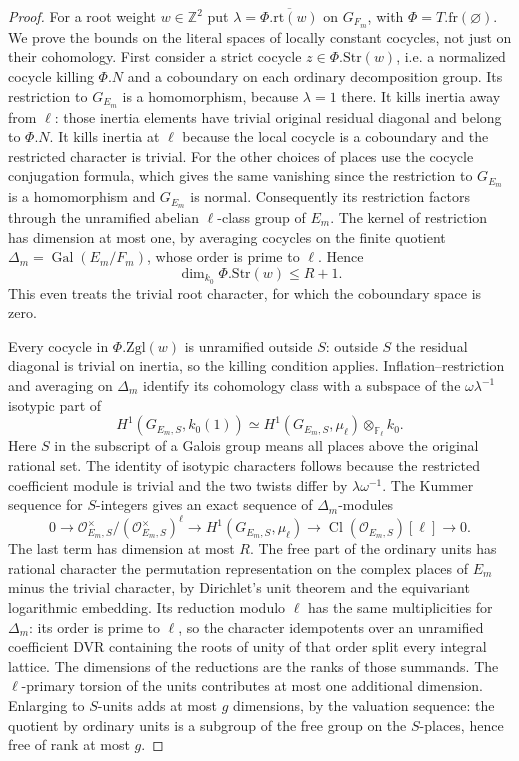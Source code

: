 \begin{proof}
For a root weight $w\in\mathbb Z^2$ put
$\lambda=\overline{\Phi.\mathrm{rt}(w)}$ on $G_{F_m}$, with
$\Phi=T.\mathrm{fr}(\varnothing)$. We prove the bounds on the
literal spaces of locally constant cocycles, not just on
their cohomology. First consider a strict cocycle
$z\in\Phi.\mathrm{Str}(w)$, i.e. a normalized cocycle
killing $\Phi.N$ and a coboundary on each ordinary
decomposition group. Its restriction to $G_{E_m}$ is a
homomorphism, because $\lambda=1$ there. It kills inertia
away from $\ell$: those inertia elements have trivial
original residual diagonal and belong to $\Phi.N$.
It kills inertia at $\ell$ because the local cocycle is a
coboundary and the restricted character is trivial.
For the other choices of places use the cocycle conjugation
formula, which gives the same vanishing since the restriction
to $G_{E_m}$ is a homomorphism and $G_{E_m}$ is normal.
Consequently its restriction factors through the unramified
abelian $\ell$-class group of $E_m$. The kernel of restriction
has dimension at most one, by averaging cocycles on the
finite quotient $\Delta_m=\operatorname{Gal}(E_m/F_m)$,
whose order is prime to $\ell$. Hence
\[
                  \dim_{k_0}\Phi.\mathrm{Str}(w)\leq R+1 .
\]
This even treats the trivial root character, for which the
coboundary space is zero.

Every cocycle in $\Phi.\mathrm{Zgl}(w)$ is unramified
outside $S$: outside $S$ the residual diagonal is trivial
on inertia, so the killing condition applies. Inflation--restriction
and averaging on $\Delta_m$ identify its cohomology class
with a subspace of the $\omega\lambda^{-1}$ isotypic part of
\[
 H^1(G_{E_m,S},k_0(1))
  \simeq H^1(G_{E_m,S},\mu_\ell)\otimes_{\mathbb F_\ell}k_0.
\]
Here $S$ in the subscript of a Galois group means all places
above the original rational set. The identity of isotypic
characters follows because the restricted coefficient module
is trivial and the two twists differ by
$\lambda\omega^{-1}$. The Kummer sequence for $S$-integers gives
an exact sequence of $\Delta_m$-modules
\[
 0\longrightarrow
 \mathcal O_{E_m,S}^{\times}/(\mathcal O_{E_m,S}^{\times})^\ell
 \longrightarrow H^1(G_{E_m,S},\mu_\ell)
 \longrightarrow \operatorname{Cl}(\mathcal O_{E_m,S})[\ell]
 \longrightarrow0.
\]
The last term has dimension at most $R$. The free part of
the ordinary units has rational character the permutation
representation on the complex places of $E_m$ minus the
trivial character, by Dirichlet's unit theorem and the
equivariant logarithmic embedding. Its reduction modulo
$\ell$ has the same multiplicities for $\Delta_m$: its order
is prime to $\ell$, so the character idempotents over an
unramified coefficient DVR containing the roots of unity
of that order split every integral lattice. The dimensions
of the reductions are the ranks of those summands.
The $\ell$-primary torsion of the units contributes at most
one additional dimension. Enlarging to $S$-units adds at
most $g$ dimensions, by the valuation sequence: the quotient
by ordinary units is a subgroup of the free group on the
$S$-places, hence free of rank at most $g$.


\end{proof}
